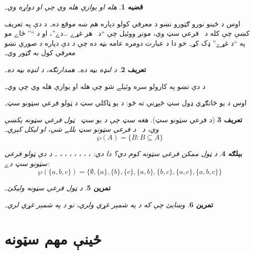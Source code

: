\documentclass[12pt,a4paper]{article}
\newcommand{\Setabs}[2]{\{#1 : #2\}}
\newcommand{\Pow}[1]{\wp(#1)}
\newcommand{\lif}{\mathbin{\rightarrow}}
\newcommand{\olfileid}[3]{\gdef\pspart{#1}\gdef\pschapter{#2}\gdef\pssection{#3}}
\newcommand{\olsection}[1]{\section{#1}\label{\pspart:\pschapter:\pssection:sec}}
\newcommand{\ollabel}[1]{\label{\pspart:\pschapter:\pssection:#1}}
\newtheorem{defn}{تعريف}[section]
\newtheorem{ex}[defn]{بېلګه}
\newtheorem{prop}[defn]{قضيه}
\newtheorem{prob}[defn]{تمرين}
\begin{document}
\begin{prop}
 هله او يوازې هله وي چې  او  دواړه وي۔
\end{prop}

اوس د ځينو نورو ګټورو نښو د معرفي کولو دپاره هم ښه موقع ده۔ د دې په تعريف کښې چې  کله د~ فرعي سټ وي، مونږ ووئيل چې ``د~ هر غړے \dots دے''، او د ``\LR{$\dots$}'' ځاے مو په ``د  غړے'' ډک کړ۔ خو دا د عبارت دومره عامه \emph{بڼه} ده چې د دې دپاره د صوري نښو معرفي کول به ګټور وي۔

\begin{defn}\ollabel{forallxina}
 د \LR{$\forall x(x \in A \lif \phi)$} لنډه بڼه ده۔ همدارنګه،  د  لنډه بڼه ده۔
\end{defn}

د دې نښو په کارولو سره وئيلے شو چې  هله او يوازې هله وي چې  وي۔

اوس د يو ځانګړي ډول سټ څېړنې ته ځو: د يو ټاکلي سټ د ټولو فرعي سټونو سټ۔

\begin{defn}[د فرعي سټونو سټ]
هغه سټ چې د يو سټ~ ټول فرعي سټونه پکښې وي، د~ \emph{د فرعي سټونو سټ} بللے شي، او \LR{$\Pow{A}$} ليکل کېږي۔
  \[
    \Pow{A} = \Setabs{B}{B \subseteq A}
  \]
\end{defn}

\begin{ex}
د  ټول ممکن فرعي سټونه کوم دي؟ دا دي: \LR{$\emptyset$}، ، ، ، ، ، ، ۔ د دې ټولو فرعي سټونو سټ \LR{$\Pow{\{a,b,c\}}$} دے:
\[
\Pow{\{ a, b, c \}} = \{\emptyset, \{a \}, \{b\}, \{c\}, \{a, b\},
\{b, c\}, \{a, c\}, \{a, b, c\}\}
\]
\end{ex}

\begin{prob}
د  ټول فرعي سټونه وليکئ۔
\end{prob}

\begin{prob}
وښايئ چې که  د  په شمېر غړي ولري، نو \LR{$\Pow{A}$} د  په شمېر غړي لري۔
\end{prob}



\olfileid{sfr}{set}{imp}
\olsection{ځينې مهم سټونه}
\end{document}
